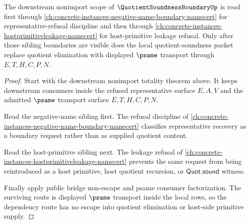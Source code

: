 \begin{theorem}
\label{thm:quotient-soundness-boundary-kernel-dependency-route}
The downstream nonimport scope of $\QuotientSoundnessBoundaryUp$ is read first through \autoref{ch:concrete-instances-negative-name-boundary-namecert} for representative-refusal discipline and then through \autoref{ch:concrete-instances-hostprimitiveleakage-namecert} for host-primitive leakage refusal. Only after those sibling boundaries are visible does the local quotient-soundness packet replace quotient elimination with displayed $\psame$ transport through $E,T,H,C,P,N$.
\end{theorem}
\begin{proof}
Start with the downstream nonimport totality theorem above. It keeps downstream consumers inside the refused representative surface $E,A,V$ and the admitted $\psame$ transport surface $E,T,H,C,P,N$.

Read the negative-name sibling first. The refusal discipline of \autoref{ch:concrete-instances-negative-name-boundary-namecert} classifies representative recovery as a boundary request rather than as supplied quotient content.

Read the host-primitive sibling next. The leakage refusal of \autoref{ch:concrete-instances-hostprimitiveleakage-namecert} prevents the same request from being reintroduced as a host primitive, host quotient recursion, or $\mathsf{Quot.sound}$ witness.

Finally apply public bridge non-escape and psame consumer factorization. The surviving route is displayed $\psame$ transport inside the local rows, so the dependency route has no escape into quotient elimination or host-side primitive supply.
\end{proof}
